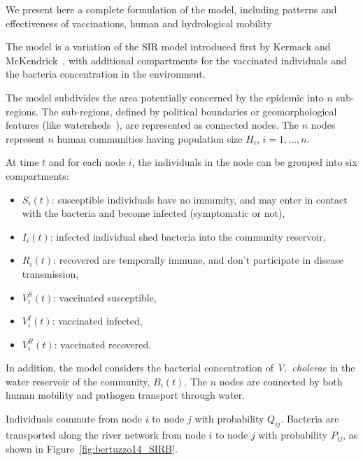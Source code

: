 We present here a complete formulation of the model, including patterns and effectiveness of vaccinations, human and hydrological mobility~\cite{bertuzzo_probability_2016,pasetto_real-time_2017}

The model is a variation of the SIR model introduced first by Kermack and McKendrick~\cite{kermack_contribution_1927}, with additional compartments for the vaccinated individuals and the bacteria concentration in the environment.

The model subdivides the area potentially concerned by the epidemic into $n$ sub-regions. The sub-regions, defined by political boundaries or geomorphological features (like watersheds~\cite{bertuzzo_probability_2016}), are represented as connected nodes. The $n$ nodes represent $n$ human communities having population size $H_i$, $i=1,\dots, n$. 

At time $t$ and for each node $i$, the individuals in the node can be grouped into six compartments:

\begin{itemize}
\item $S_i(t)$: susceptible individuals  have no immunity, and may enter in contact with the bacteria and become infected (symptomatic or not),
\item $I_i(t)$: infected individual shed bacteria into the community reservoir,
\item $R_i(t)$: recovered are temporally immune, and don't participate in disease transmission,
\item $V^S_i(t)$: vaccinated susceptible,
\item $V^I_i(t)$: vaccinated infected,
\item $V^R_i(t)$: vaccinated recovered.
\end{itemize}

In addition, the model considers the bacterial concentration of \textit{V.~cholerae} in the water reservoir of the community, $B_i(t)$. The $n$ nodes are connected by both human mobility and pathogen transport through water.

Individuals commute from node $i$ to node $j$ with probability $Q_{ij}$. Bacteria are transported along the river network from node $i$ to node $j$ with probability $P_{ij}$, as shown in Figure~\ref{fig:bertuzzo14_SIRB}.


